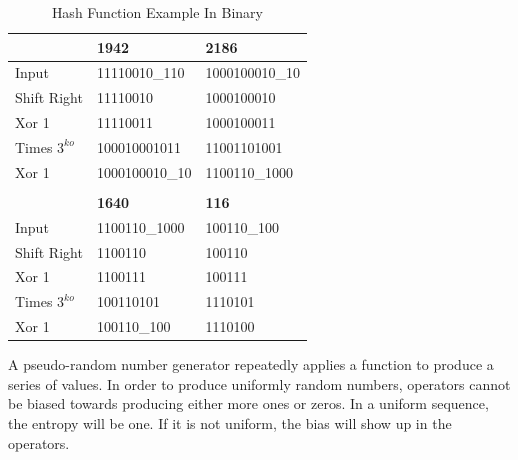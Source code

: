 \documentclass[preprint]{sigplanconf}
\begin{document}
\begin{table} [ht]
    \begin{center}
        \begin{tabular}{|l|l|l|}
            \hline
                           & \textbf{1942}             & \textbf{2186}             \\
            \hline
            Input          & 11110010\_110             & \phantom{1}1000100010\_10 \\
            \hline
            Shift Right    & 11110010                  & \phantom{1}1000100010     \\
            \hline
            Xor 1          & 11110011                  & \phantom{1}1000100011     \\
            \hline
            Times $3^{ko}$ & 100010001011              & 11001101001               \\
            \hline
            Xor 1          & 1000100010\_10            & 1100110\_1000             \\
            \hline
                           &                           &                           \\
                           & \textbf{1640}             & \textbf{116}              \\
            \hline
            Input          & \phantom{11}1100110\_1000 & \phantom{1}100110\_100    \\
            \hline
            Shift Right    & \phantom{11}1100110       & \phantom{1}100110         \\
            \hline
            Xor 1          & \phantom{11}1100111       & \phantom{1}100111         \\
            \hline
            Times $3^{ko}$ & 100110101                 & 1110101                   \\
            \hline
            Xor 1          & 100110\_100               & 1110100                   \\
            \hline
        \end{tabular}
        \caption{Hash Function Example In Binary}
        \label{tab-3}
    \end{center}
\end{table}

A pseudo-random number generator repeatedly applies a function to produce a series of values. In order to produce uniformly random numbers, operators cannot be biased towards producing either more ones or zeros. In a uniform sequence, the entropy will be one. If it is not uniform, the bias will show up in the operators.
\end{document}
